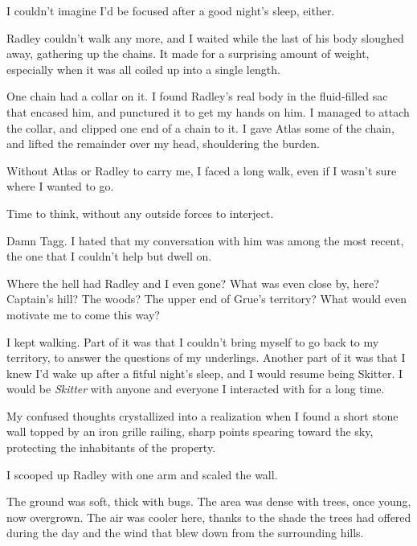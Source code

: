 I couldn't imagine I'd be focused after a good night's sleep, either.



Radley couldn't walk any more, and I waited while the last of his body sloughed away, gathering up the chains.  It made for a surprising amount of weight, especially when it was all coiled up into a single length.



One chain had a collar on it.  I found Radley's real body in the fluid-filled sac that  encased him, and punctured it to get my hands on him.  I managed to attach the collar, and clipped one end of a chain to it.  I gave Atlas some of the chain, and lifted the remainder over my head, shouldering the burden.



Without Atlas or Radley to carry me, I faced a long walk, even if I wasn't sure where I wanted to go.



Time to think, without any outside forces to interject.



Damn Tagg.  I hated that my conversation with him was among the most recent, the one that I couldn't help but dwell on.



Where the hell had Radley and I even gone?  What was even close by, here?  Captain's hill?  The woods?  The upper end of Grue's territory?  What would even motivate me to come this way?



I kept walking.  Part of it was that I couldn't bring myself to go back to my territory, to answer the questions of my underlings.  Another part of it was that I knew I'd wake up after a fitful night's sleep, and I would resume being Skitter.  I would be \emph{Skitter} with anyone and everyone I interacted with for a long time.



My confused thoughts crystallized into a realization when I found a short stone wall topped by an iron grille railing, sharp points spearing toward the sky, protecting the inhabitants of the property.



I scooped up Radley with one arm and scaled the wall.



The ground was soft, thick with bugs.  The area was dense with trees, once young, now overgrown.  The air was cooler here, thanks to the shade the trees had offered during the day and the wind that blew down from the surrounding hills.



